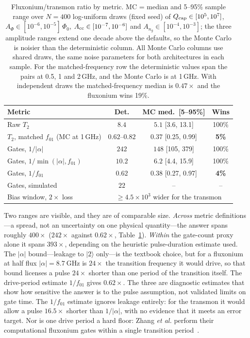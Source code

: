 \documentclass{SciPost}
\begin{document}
\begin{table}[tbp]
\caption{Fluxonium/transmon ratio by metric. MC = median and 5--95\% sample range over $N=400$
log-uniform draws (fixed seed) of $Q_{\rm cap}\in[10^5,10^7]$, $A_\Phi\in[10^{-6},10^{-5}]\,\Phi_0$,
$A_{\rm cc}\in[10^{-7},10^{-6}]$ and $A_{n_g}\in[10^{-4},10^{-3}]$; the three amplitude ranges extend one
decade above the defaults, so the Monte Carlo is noisier than the deterministic column. All Monte Carlo columns use shared draws, the
same noise parameters for both architectures in each sample. For the matched-frequency row the
deterministic values span the pairs at 0.5, 1 and 2\,GHz, and the Monte Carlo is at 1\,GHz. With independent draws the matched-frequency median is $0.47\times$
and the fluxonium wins 19\%.}
\label{tab:q3}
\centering
\begin{tabular}{@{}lccc@{}}
\toprule
Metric & Det. & MC med.\ [5--95\%] & Wins\\
\midrule
Raw $T_2$                       & $8.4$       & $5.1$ [3.6, 13.1]    & 100\%\\
$T_2$, matched $f_{01}$ (MC at 1\,GHz) & $\mathbf{0.62}$--$\mathbf{0.82}$ & $\mathbf{0.37}$ [0.25, 0.99] & \textbf{5\%}\\
Gates, $1/|\alpha|$             & $242$       & $148$ [105, 379]     & 100\%\\
Gates, $1/\min(|\alpha|,f_{01})$ & $10.2$     & $6.2$ [4.4, 15.9]    & 100\%\\
Gates, $1/f_{01}$               & $\mathbf{0.62}$ & $\mathbf{0.38}$ [0.27, 0.97] & \textbf{4\%}\\
Gates, simulated                & $22$        & --                   & --\\
\midrule
Bias window, $2\times$ loss     & \multicolumn{3}{c}{$\ge4.5\times10^{3}$ wider for the transmon}\\
\bottomrule
\end{tabular}
\end{table}

Two ranges are visible, and they are of comparable size. \emph{Across} metric definitions---a spread, not an uncertainty on one physical quantity---the answer
spans roughly $400\times$ ($242\times$ against $0.62\times$, Table~\ref{tab:q3}). \emph{Within} the gate-count proxy alone it spans $393\times$, depending on the heuristic
pulse-duration estimate used. The $|\alpha|$ bound---leakage to
$|2\rangle$ only---is the textbook choice, but for a fluxonium at half flux
$|\alpha| = \SI{8.7}{\giga\hertz}$ is $24\times$ the transition frequency it would drive, so
that bound licenses a pulse $24\times$ shorter than one period of the transition itself. The
drive-period estimate $1/f_{01}$ gives $0.62\times$. The three are diagnostic estimates that show
how sensitive the answer is to the pulse assumption, not validated limits on gate time. The
$1/f_{01}$ estimate ignores leakage entirely: for the transmon it would allow a pulse
$16.5\times$ shorter than $1/|\alpha|$, with no evidence that it meets an error target. Nor is one drive period a hard floor: Zhang \emph{et al.} perform their computational fluxonium
gates within a single transition period~\cite{zhang2021}.
\end{document}

